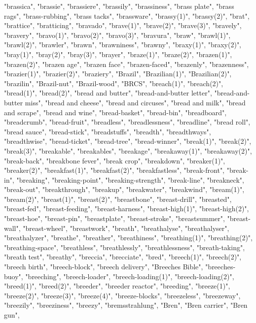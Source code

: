 "brassica",
"brassie",
"brassiere",
"brassily",
"brassiness",
"brass plate",
"brass rags",
"brass-rubbing",
"brass tacks",
"brassware",
"brassy(1)",
"brassy(2)",
"brat",
"brattice",
"bratticing",
"bravado",
"brave(1)",
"brave(2)",
"brave(3)",
"bravely",
"bravery",
"bravo(1)",
"bravo(2)",
"bravo(3)",
"bravura",
"braw",
"brawl(1)",
"brawl(2)",
"brawler",
"brawn",
"brawniness",
"brawny",
"braxy(1)",
"braxy(2)",
"bray(1)",
"bray(2)",
"bray(3)",
"brayer",
"braze(1)",
"braze(2)",
"brazen(1)",
"brazen(2)",
"brazen age",
"brazen face",
"brazen-faced",
"brazenly",
"brazenness",
"brazier(1)",
"brazier(2)",
"braziery",
"Brazil",
"Brazilian(1)",
"Brazilian(2)",
"brazilin",
"Brazil-nut",
"Brazil-wood",
"BRCS",
"breach(1)",
"breach(2)",
"bread(1)",
"bread(2)",
"bread and butter",
"bread-and-butter letter",
"bread-and-butter miss",
"bread and cheese",
"bread and circuses",
"bread and milk",
"bread and scrape",
"bread and wine",
"bread-basket",
"bread-bin",
"breadboard",
"breadcrumb",
"bread-fruit",
"breadless",
"breadlessness",
"breadline",
"bread roll",
"bread sauce",
"bread-stick",
"breadstuffs",
"breadth",
"breadthways",
"breadthwise",
"bread-ticket",
"bread-tree",
"bread-winner",
"break(1)",
"break(2)",
"break(3)",
"breakable",
"breakables",
"breakage",
"breakaway(1)",
"breakaway(2)",
"break-back",
"breakbone fever",
"break crop",
"breakdown",
"breaker(1)",
"breaker(2)",
"breakfast(1)",
"breakfast(2)",
"breakfastless",
"break-front",
"break-in",
"breaking",
"breaking-point",
"breaking-strength",
"break-line",
"breakneck",
"break-out",
"breakthrough",
"breakup",
"breakwater",
"breakwind",
"bream(1)",
"bream(2)",
"breast(1)",
"breast(2)",
"breastbone",
"breast-drill",
"breasted",
"breast-fed",
"breast-feeding",
"breast-harness",
"breast-high(1)",
"breast-high(2)",
"breast-hoe",
"breast-pin",
"breastplate",
"breast-stroke",
"breastsummer",
"breast-wall",
"breast-wheel",
"breastwork",
"breath",
"breathalyse",
"breathalyser",
"breathalyzer",
"breathe",
"breather",
"breathiness",
"breathing(1)",
"breathing(2)",
"breathing-space",
"breathless",
"breathlessly",
"breathlessness",
"breath-taking",
"breath test",
"breathy",
"breccia",
"brecciate",
"bred",
"breech(1)",
"breech(2)",
"breech birth",
"breech-block",
"breech delivery",
"Breeches Bible",
"breeches-buoy",
"breeching",
"breech-loader",
"breech-loading(1)",
"breech-loading(2)",
"breed(1)",
"breed(2)",
"breeder",
"breeder reactor",
"breeding",
"breeze(1)",
"breeze(2)",
"breeze(3)",
"breeze(4)",
"breeze-blocks",
"breezeless",
"breezeway",
"breezily",
"breeziness",
"breezy",
"bremsstrahlung",
"Bren",
"Bren carrier",
"Bren gun",
